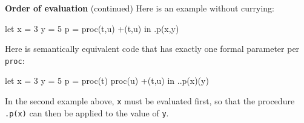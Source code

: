 \begin{minipage}[t]{\sw}
\slidenumber
\LARGE
{\bf Order of evaluation} (continued)\exx
Here is an example without currying:
{\Large
\begin{qv}
let
  x = 3
  y = 5
  p = proc(t,u) +(t,u)
in
  .p(x,y) %
\end{qv}
}
Here is semantically equivalent code
that has exactly one formal parameter per \verb'proc':
{\Large
\begin{qv}
let
  x = 3
  y = 5
  p = proc(t) proc(u) +(t,u)
in
  ..p(x)(y)
\end{qv}
}
In the second example above, \verb'x' must be evaluated first,
so that the procedure \verb'.p(x)' can then be applied
to the value of \verb'y'.
\end{minipage}
\clearpage
